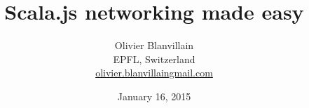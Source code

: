 \documentclass[12pt]{article}
\title{Scala.js networking made easy}
\author{
  Olivier Blanvillain\\
  EPFL, Switzerland\\
  \href{mailto:olivier.blanvillain@gmail.com}{olivier.blanvillain{\at}gmail.com}
}
\date{January 16, 2015}
\begin{document}

  \maketitle

  \begin{abstract}
    
  \end{abstract}

  

  
  
\end{document}
